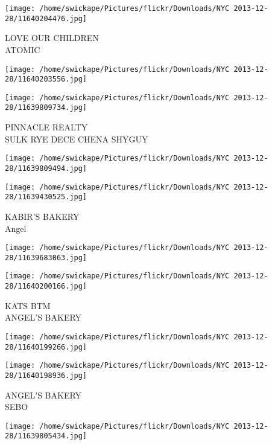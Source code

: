 \documentclass[10pt,letterpaper]{article}
\begin{document}
\vspace{0.25in}
\texttt{[image: /home/swickape/Pictures/flickr/Downloads/NYC 2013-12-28/11640204476.jpg]}

LOVE OUR CHILDREN\\
ATOMIC\\
\pagebreak

\texttt{[image: /home/swickape/Pictures/flickr/Downloads/NYC 2013-12-28/11640203556.jpg]}

\vspace{0.25in}
\texttt{[image: /home/swickape/Pictures/flickr/Downloads/NYC 2013-12-28/11639809734.jpg]}

PINNACLE REALTY\\
SULK RYE DECE CHENA SHYGUY\\
\pagebreak

\texttt{[image: /home/swickape/Pictures/flickr/Downloads/NYC 2013-12-28/11639809494.jpg]}

\vspace{0.25in}
\texttt{[image: /home/swickape/Pictures/flickr/Downloads/NYC 2013-12-28/11639430525.jpg]}

KABIR'S BAKERY\\
Angel\\
\pagebreak

\texttt{[image: /home/swickape/Pictures/flickr/Downloads/NYC 2013-12-28/11639683063.jpg]}

\vspace{0.25in}
\texttt{[image: /home/swickape/Pictures/flickr/Downloads/NYC 2013-12-28/11640200166.jpg]}

KATS BTM\\
ANGEL'S BAKERY\\
\pagebreak

\texttt{[image: /home/swickape/Pictures/flickr/Downloads/NYC 2013-12-28/11640199266.jpg]}

\vspace{0.25in}
\texttt{[image: /home/swickape/Pictures/flickr/Downloads/NYC 2013-12-28/11640198936.jpg]}

ANGEL'S BAKERY\\
SEBO\\
\pagebreak

\texttt{[image: /home/swickape/Pictures/flickr/Downloads/NYC 2013-12-28/11639805434.jpg]}
\end{document}
